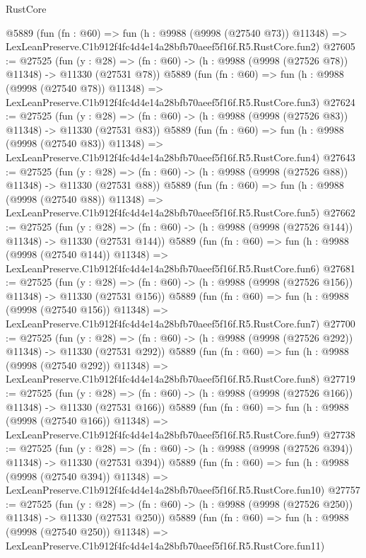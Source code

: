 \begin{lexlean}{RustCore}
\begin{coremodule}
    @5889
    (fun (fn : @60) =>
    fun (h : @9988 (@9998 (@27540 @73)) @11348) =>
    LexLeanPreserve.C1b912f4fc4d4e14a28bfb70aeef5f16f.R5.RustCore.fun2)
@27605 := @27525
    (fun (y : @28) => (fn : @60) -> (h : @9988 (@9998 (@27526 @78)) @11348) -> @11330 (@27531 @78))
    @5889
    (fun (fn : @60) =>
    fun (h : @9988 (@9998 (@27540 @78)) @11348) =>
    LexLeanPreserve.C1b912f4fc4d4e14a28bfb70aeef5f16f.R5.RustCore.fun3)
@27624 := @27525
    (fun (y : @28) => (fn : @60) -> (h : @9988 (@9998 (@27526 @83)) @11348) -> @11330 (@27531 @83))
    @5889
    (fun (fn : @60) =>
    fun (h : @9988 (@9998 (@27540 @83)) @11348) =>
    LexLeanPreserve.C1b912f4fc4d4e14a28bfb70aeef5f16f.R5.RustCore.fun4)
@27643 := @27525
    (fun (y : @28) => (fn : @60) -> (h : @9988 (@9998 (@27526 @88)) @11348) -> @11330 (@27531 @88))
    @5889
    (fun (fn : @60) =>
    fun (h : @9988 (@9998 (@27540 @88)) @11348) =>
    LexLeanPreserve.C1b912f4fc4d4e14a28bfb70aeef5f16f.R5.RustCore.fun5)
@27662 := @27525
    (fun (y : @28) =>
    (fn : @60) -> (h : @9988 (@9998 (@27526 @144)) @11348) -> @11330 (@27531 @144))
    @5889
    (fun (fn : @60) =>
    fun (h : @9988 (@9998 (@27540 @144)) @11348) =>
    LexLeanPreserve.C1b912f4fc4d4e14a28bfb70aeef5f16f.R5.RustCore.fun6)
@27681 := @27525
    (fun (y : @28) =>
    (fn : @60) -> (h : @9988 (@9998 (@27526 @156)) @11348) -> @11330 (@27531 @156))
    @5889
    (fun (fn : @60) =>
    fun (h : @9988 (@9998 (@27540 @156)) @11348) =>
    LexLeanPreserve.C1b912f4fc4d4e14a28bfb70aeef5f16f.R5.RustCore.fun7)
@27700 := @27525
    (fun (y : @28) =>
    (fn : @60) -> (h : @9988 (@9998 (@27526 @292)) @11348) -> @11330 (@27531 @292))
    @5889
    (fun (fn : @60) =>
    fun (h : @9988 (@9998 (@27540 @292)) @11348) =>
    LexLeanPreserve.C1b912f4fc4d4e14a28bfb70aeef5f16f.R5.RustCore.fun8)
@27719 := @27525
    (fun (y : @28) =>
    (fn : @60) -> (h : @9988 (@9998 (@27526 @166)) @11348) -> @11330 (@27531 @166))
    @5889
    (fun (fn : @60) =>
    fun (h : @9988 (@9998 (@27540 @166)) @11348) =>
    LexLeanPreserve.C1b912f4fc4d4e14a28bfb70aeef5f16f.R5.RustCore.fun9)
@27738 := @27525
    (fun (y : @28) =>
    (fn : @60) -> (h : @9988 (@9998 (@27526 @394)) @11348) -> @11330 (@27531 @394))
    @5889
    (fun (fn : @60) =>
    fun (h : @9988 (@9998 (@27540 @394)) @11348) =>
    LexLeanPreserve.C1b912f4fc4d4e14a28bfb70aeef5f16f.R5.RustCore.fun10)
@27757 := @27525
    (fun (y : @28) =>
    (fn : @60) -> (h : @9988 (@9998 (@27526 @250)) @11348) -> @11330 (@27531 @250))
    @5889
    (fun (fn : @60) =>
    fun (h : @9988 (@9998 (@27540 @250)) @11348) =>
    LexLeanPreserve.C1b912f4fc4d4e14a28bfb70aeef5f16f.R5.RustCore.fun11)

\end{coremodule}
\end{lexlean}

